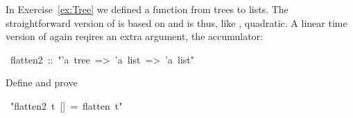 \begin{isabelle}%
%
\begin{isamarkuptext}%
\noindent In Exercise~\ref{ex:Tree} we defined a function
 from trees to lists. The straightforward version of
 is based on \isa{\at} and is thus, like , quadratic.
A linear time version of  again reqires an extra
argument, the accumulator:%
\end{isamarkuptext}%
~flatten2~::~{"}'a~tree~=>~'a~list~=>~'a~list{"}%
\begin{isamarkuptext}%
\noindent Define  and prove%
\end{isamarkuptext}%
~{"}flatten2~t~[]~=~flatten~t{"}\end{isabelle}%
